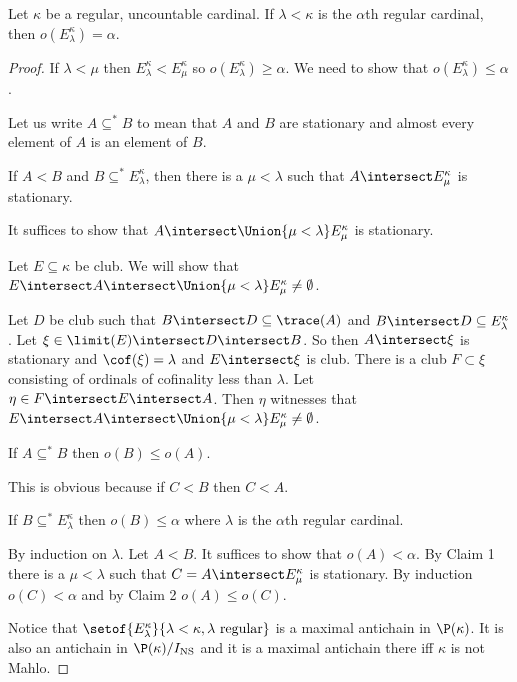 \documentclass[oneside,12pt]{amsart}
\begin{document}
\begin{lemma}
Let $\kappa$ be a regular, uncountable cardinal.
If $\lambda<\kappa$ is the $\alpha$th regular cardinal, then $o(E^{\kappa}_{\lambda}) = \alpha$.
\end{lemma}
\begin{proof}
If $\lambda < \mu$ then $E^{\kappa}_{\lambda} < E^{\kappa}_{\mu}$ so $o(E^{\kappa}_{\lambda}) \geq \alpha$.
We need to show that $o(E^{\kappa}_{\lambda}) \leq \alpha$.

Let us write $A \subseteq^{*} B$ to mean that $A$ and $B$ are stationary and almost every element of $A$ is an element of $B$.

\begin{claim}[Claim 1]
If $A<B$ and $B \subseteq^{*} E^{\kappa}_{\lambda}$, then there is a $\mu<\lambda$ such that $A\intersect E^{\kappa}_{\mu}$ is stationary.
\end{claim}
\begin{subproof}
It suffices to show that $A\intersect \Union{\mu<\lambda}E^{\kappa}_{\mu}$ is stationary.

Let $E\subseteq \kappa$ be club. We will show that $E\intersect A \intersect \Union{\mu<\lambda}E^{\kappa}_{\mu} \not= \emptyset$.

Let $D$ be club such that $B\intersect D \subseteq \trace(A)$ and $B\intersect D \subseteq E^{\kappa}_{\lambda}$.
Let $\xi\in \limit(E) \intersect D \intersect B$. So then $A\intersect \xi$ is stationary and $\cof(\xi) = \lambda$ and
$E\intersect\xi$ is club. There is a club $F\subset \xi$ consisting of ordinals of cofinality less than $\lambda$.
Let $\eta\in F\intersect E \intersect A$. Then $\eta$ witnesses that
 $E\intersect A \intersect \Union{\mu<\lambda}E^{\kappa}_{\mu} \not= \emptyset$.
\end{subproof}

\begin{claim}[Claim 2]
If $A\subseteq^{*} B$ then $o(B)\leq o(A)$.
\end{claim}
\begin{subproof}
This is obvious because if $C < B$ then $C < A$.
\end{subproof}

\begin{claim}[Claim 3]
If $B\subseteq^{*}E^{\kappa}_{\lambda}$ then $o(B)\leq\alpha$ where $\lambda$ is the $\alpha$th regular cardinal.
\end{claim}
\begin{subproof}
By induction on $\lambda$. Let $A<B$. It suffices to show that $o(A)<\alpha$. By Claim 1 there is a
$\mu<\lambda$ such that $C = A\intersect E^{\kappa}_{\mu}$ is stationary. By induction $o(C) < \alpha$ and by
Claim 2 $o(A)\leq o(C)$.
\end{subproof}

Notice that $\setof{E^{\kappa}_{\lambda}}{\lambda < \kappa, \lambda \text{ regular}}$ is a maximal antichain in
 $\P(\kappa)$. It is also an antichain in $\P(\kappa) / I_{\text{NS}}$ and it is a maximal antichain there
iff $\kappa$ is not Mahlo.

\end{proof}
\end{document}
